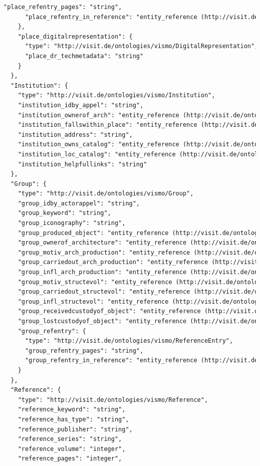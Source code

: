 \begin{lstlisting}[caption={JSON \q{Schema} der ViSIT Daten, die über die REST API ausgespielt werden.},label={lst:json},captionpos=b,language=xml]
      "place_refentry_pages": "string",
      "place_refentry_in_reference": "entity_reference (http://visit.de/ontologies/vismo/Reference)"
    },
    "place_digitalrepresentation": {
      "type": "http://visit.de/ontologies/vismo/DigitalRepresentation",
      "place_dr_techmetadata": "string"
    }
  },
  "Institution": {
    "type": "http://visit.de/ontologies/vismo/Institution",
    "institution_idby_appel": "string",
    "institution_ownerof_arch": "entity_reference (http://visit.de/ontologies/vismo/Architecture)",
    "institution_fallswithin_place": "entity_reference (http://visit.de/ontologies/vismo/Place)",
    "institution_address": "string",
    "institution_owns_catalog": "entity_reference (http://visit.de/ontologies/vismo/Reference)",
    "institution_loc_catalog": "entity_reference (http://visit.de/ontologies/vismo/Reference)",
    "institution_helpfullinks": "string"
  },
  "Group": {
    "type": "http://visit.de/ontologies/vismo/Group",
    "group_idby_actorappel": "string",
    "group_keyword": "string",
    "group_iconography": "string",
    "group_produced_object": "entity_reference (http://visit.de/ontologies/vismo/Object)",
    "group_ownerof_architecture": "entity_reference (http://visit.de/ontologies/vismo/Architecture)",
    "group_motiv_arch_production": "entity_reference (http://visit.de/ontologies/vismo/Architecture)",
    "group_carriedout_arch_production": "entity_reference (http://visit.de/ontologies/vismo/Architecture)",
    "group_infl_arch_production": "entity_reference (http://visit.de/ontologies/vismo/Architecture)",
    "group_motiv_structevol": "entity_reference (http://visit.de/ontologies/vismo/Architecture)",
    "group_carriedout_structevol": "entity_reference (http://visit.de/ontologies/vismo/Architecture)",
    "group_infl_structevol": "entity_reference (http://visit.de/ontologies/vismo/Architecture)",
    "group_receivedcustodyof_object": "entity_reference (http://visit.de/ontologies/vismo/Object)",
    "group_lostcustodyof_object": "entity_reference (http://visit.de/ontologies/vismo/Object)",
    "group_refentry": {
      "type": "http://visit.de/ontologies/vismo/ReferenceEntry",
      "group_refentry_pages": "string",
      "group_refentry_in_reference": "entity_reference (http://visit.de/ontologies/vismo/Reference)"
    }
  },
  "Reference": {
    "type": "http://visit.de/ontologies/vismo/Reference",
    "reference_keyword": "string",
    "reference_has_type": "string",
    "reference_publisher": "string",
    "reference_series": "string",
    "reference_volume": "integer",
    "reference_pages": "integer",

\end{lstlisting}
